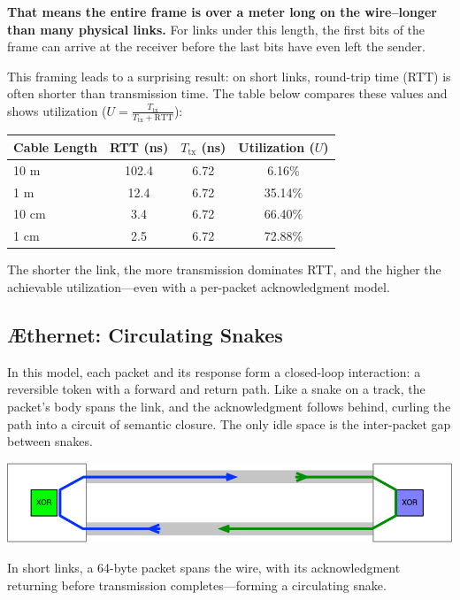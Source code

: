 \documentclass[../OAE-SPEC-MAIN.tex]{subfiles}
\begin{document}
\textbf{That means the entire frame is over a meter long on the wire--longer than many physical links.} For links under this length, the first bits of the frame can arrive at the receiver before the last bits have even left the sender.

This framing leads to a surprising result: on short links, round-trip time (RTT) is often shorter than transmission time. The table below compares these values and shows utilization (\( U = \frac{T_{\text{tx}}}{T_{\text{tx}} + \text{RTT}} \)):

\begin{center}
\begin{tabular}{@{}lccc@{}}
\toprule
Cable Length & RTT (ns) & $T_{\text{tx}}$ (ns) & Utilization ($U$) \\
\midrule
10 m  & 102.4  & 6.72   & 6.16\% \\
1 m   & 12.4   & 6.72   & 35.14\% \\
10 cm & 3.4    & 6.72   & 66.40\% \\
1 cm  & 2.5    & 6.72   & 72.88\% \\
\bottomrule
\end{tabular}
\end{center}

The shorter the link, the more transmission dominates RTT, and the higher the achievable utilization—even with a per-packet acknowledgment model.

\subsection{\AE thernet: Circulating Snakes}

In this model, each packet and its response form a closed-loop interaction: a reversible token with a forward and return path. Like a snake on a track, the packet’s body spans the link, and the acknowledgment follows behind, curling the path into a circuit of semantic closure. The only idle space is the inter-packet gap between snakes.

\begin{marginfigure}
  \includegraphics[width=\linewidth]{./figures/SNAKE_dualframe.png}
  \caption{In short links, a 64-byte packet spans the wire, with its acknowledgment returning before transmission completes—forming a circulating snake.}
\end{marginfigure}
\end{document}
